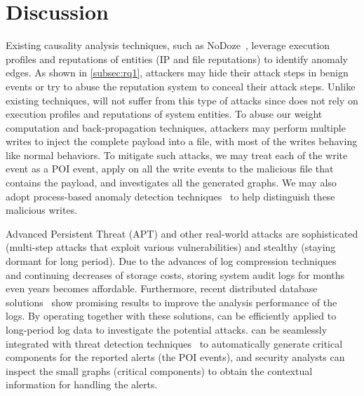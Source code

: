 \section{Discussion}
\label{sec:discussion}

Existing causality analysis techniques, such as NoDoze~\cite{hassan2019nodoze}, leverage execution profiles and reputations of entities (\eg IP and file reputations) to identify anomaly edges.
As shown in \cref{subsec:rq1}, attackers may hide their attack steps in benign events or try to abuse the reputation system to conceal their attack steps.
Unlike existing techniques, \tool will not suffer from this type of attacks since \tool does not rely on execution profiles and reputations of system entities.
To abuse our weight computation and back-propagation techniques, attackers may perform multiple writes to inject the complete payload into a file, with most of the writes behaving like normal behaviors. 
To mitigate such attacks, we may treat each of the write event as a POI event, apply \tool on all the write events to the malicious file that contains the payload, and investigates all the generated graphs. 
We may also adopt process-based anomaly detection techniques~\cite{processanomaly,processanomaly2} to help distinguish these malicious writes.



Advanced Persistent Threat (APT) and other real-world attacks are sophisticated (multi-step attacks that exploit various vulnerabilities) and stealthy (staying dormant for long period). 
Due to the advances of log compression techniques~\cite{reduction, reduction2, reduction3, michael2020forensic} and continuing decreases of storage costs, storing system audit logs for months even years becomes affordable. 
Furthermore, recent distributed database solutions~\cite{cassandra,hbase} show promising results to improve the analysis performance of the logs.
By operating together with these solutions, \tool can be efficiently applied to long-period log data to investigate the potential attacks.
\tool can be seamlessly integrated with threat detection techniques~\cite{han2020unicorn,netwrix,tds1,intrusionbook} to automatically generate critical components for the reported alerts (\ie the POI events), and security analysts can inspect the small graphs (\ie critical components) to obtain the contextual information for handling the alerts. 


